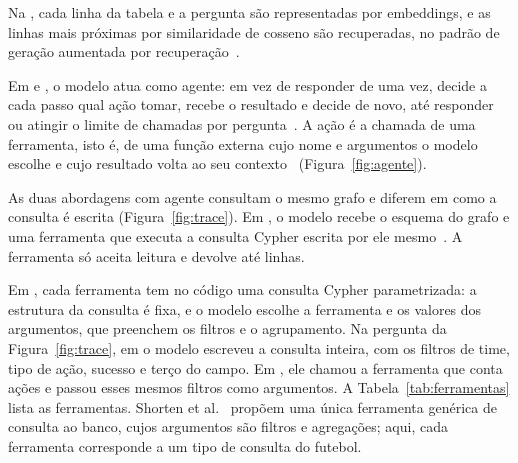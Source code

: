 Na \armVector{}, cada linha da tabela e a pergunta são representadas por embeddings, e as \nTopK{} linhas mais
próximas por similaridade de cosseno são recuperadas, no padrão de geração aumentada por
recuperação~\cite{lewis2020rag}.

Em \armTextToCypher{} e \armGraphTools{}, o modelo atua como agente: em vez de responder de uma vez, decide a cada
passo qual ação tomar, recebe o resultado e decide de novo, até responder ou atingir o limite de chamadas por
pergunta~\cite{wang2024agentssurvey,yao2023react}. A ação é a chamada de uma ferramenta, isto é, de uma função
externa cujo nome e argumentos o modelo escolhe e cujo resultado volta ao seu contexto~\cite{schick2023toolformer}
(Figura~\ref{fig:agente}).



As duas abordagens com agente consultam o mesmo grafo e diferem em como a consulta é escrita
(Figura~\ref{fig:trace}). Em \armTextToCypher{}, o modelo recebe o esquema do grafo e uma ferramenta que executa
a consulta Cypher escrita por ele mesmo~\cite{ozsoy2025text2cypher}. A ferramenta só aceita leitura e devolve até
\nMaxRows{} linhas.

Em \armGraphTools{}, cada ferramenta tem no código uma consulta Cypher parametrizada: a estrutura da consulta é
fixa, e o modelo escolhe a ferramenta e os valores dos argumentos, que preenchem os filtros e o agrupamento. Na
pergunta da Figura~\ref{fig:trace}, em \armTextToCypher{} o modelo escreveu a consulta inteira, com os filtros de
time, tipo de ação, sucesso e terço do campo. Em \armGraphTools{}, ele chamou a ferramenta que conta ações e passou
esses mesmos filtros como argumentos. A Tabela~\ref{tab:ferramentas} lista as \nTools{} ferramentas. Shorten et
al.~\cite{shorten2025dbfunction} propõem uma única ferramenta genérica de consulta ao banco, cujos argumentos são
filtros e agregações; aqui, cada ferramenta corresponde a um tipo de consulta do futebol.


